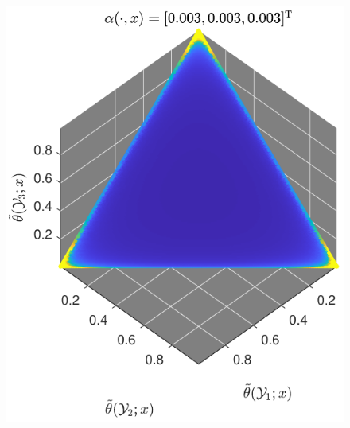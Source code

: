 \documentclass[aspectratio=169]{beamer}
\begin{document}
\begin{frame}
\begin{columns}[T]
\begin{column}{.4\linewidth}
\begin{figure}
\centering
\includegraphics[width=0.5\linewidth]{P_theta_highVar.pdf}
\label{fig:P_theta_highVar}
\end{figure}

\end{column}

\end{columns}







\end{frame}
\end{document}
